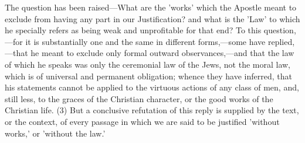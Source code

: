 \documentclass[
]{book}
\begin{document}
The question has been raised---What are the 'works' which the Apostle meant to exclude from having any part in our Justification? and what is the 'Law' to which he specially refers as being weak and unprofitable for that end? To this question,---for it is substantially one and the same in different forms,---some have replied,---that he meant to exclude only formal outward observances,---and that the law of which he speaks was only the ceremonial law of the Jews, not the moral law, which is of universal and permanent obligation; whence they have inferred, that his statements cannot be applied to the virtuous actions of any class of men, and, still less, to the graces of the Christian character, or the good works of the Christian life. (3) But a conclusive refutation of this reply is supplied by the text, or the context, of every passage in which we are said to be justified 'without works,' or 'without the law.'
\end{document}
